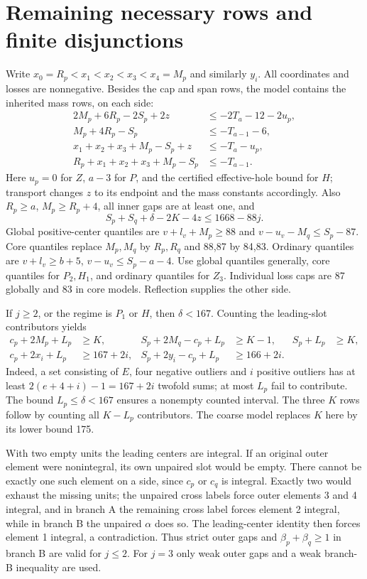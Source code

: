 \documentclass[11pt,a4paper]{article}
\begin{document}
\section{Remaining necessary rows and finite disjunctions}
Write $x_0=R_p<x_1<x_2<x_3<x_4=M_p$ and similarly $y_i$.
All coordinates and losses are nonnegative. Besides the cap and span
rows, the model contains the inherited mass rows, on each side:
\begin{align*}
 2M_p+6R_p-2S_p+2z&\le-2T_a-12-2u_p,\\
 M_p+4R_p-S_p&\le-T_{a-1}-6,\\
 x_1+x_2+x_3+M_p-S_p+z&\le-T_a-u_p,\\
 R_p+x_1+x_2+x_3+M_p-S_p&\le-T_{a-1}.
\end{align*}
Here $u_p=0$ for $Z$, $a-3$ for $P$, and the certified effective-hole
bound for $H$; transport changes $z$ to its endpoint and the mass
constants accordingly. Also $R_p\ge a$, $M_p\ge R_p+4$, all inner gaps
are at least one, and
\[
 S_p+S_q+\delta-2K-4z\le1668-88j.
\]
Global positive-center quantiles are
$v+l_v+M_p\ge88$ and $v-u_v-M_q\le S_p-87$.
Core quantiles replace $M_p,M_q$ by $R_p,R_q$ and 88,87 by 84,83.
Ordinary quantiles are $v+l_v\ge b+5$, $v-u_v\le S_p-a-4$.
Use global quantiles generally, core quantiles for $P_2,H_1$, and
ordinary quantiles for $Z_3$. Individual loss caps are 87 globally and
83 in core models. Reflection supplies the other side.

If $j\ge2$, or the regime is $P_1$ or $H$, then $\delta<167$.
Counting the leading-slot contributors yields
\begin{align*}
 c_p+2M_p+L_p&\ge K,&S_p+2M_q-c_p+L_p&\ge K-1,&S_p+L_p&\ge K,\\
 c_p+2x_i+L_p&\ge167+2i,&S_p+2y_i-c_p+L_p&\ge166+2i.
\end{align*}
Indeed, a set consisting of $E$, four negative outliers and $i$ positive
outliers has at least $2(e+4+i)-1=167+2i$ twofold sums; at most $L_p$
fail to contribute. The bound $L_p\le\delta<167$ ensures a nonempty
counted interval. The three $K$ rows follow by counting all $K-L_p$
contributors. The coarse model replaces $K$ here by its lower bound 175.

With two empty units the leading centers are integral. If an original
outer element were nonintegral, its own unpaired slot would be empty.
There cannot be exactly one such element on a side, since $c_p$ or
$c_q$ is integral. Exactly two would exhaust the missing units; the
unpaired cross labels force outer elements 3 and 4 integral, and in
branch A the remaining cross label forces element 2 integral, while in
branch B the unpaired $\alpha$ does so. The leading-center identity then
forces element 1 integral, a contradiction. Thus strict outer gaps and
$\beta_p+\beta_q\ge1$ in branch B are valid for $j\le2$. For $j=3$
only weak outer gaps and a weak branch-B inequality are used.
\end{document}
